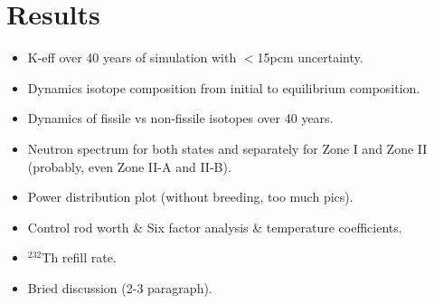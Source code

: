 \section{Results}

\begin{itemize}
  \item K-eff over 40 years of simulation with $<$15pcm uncertainty.
  \item Dynamics isotope composition from initial to equilibrium composition.
  \item Dynamics of fissile vs non-fissile isotopes over 40 years.
  \item Neutron spectrum for both states and separately for Zone I and Zone II (probably, even Zone II-A and II-B).
  \item Power distribution plot (without breeding, too much pics).
  \item Control rod worth \& Six factor analysis \& temperature coefficients.
  \item $^{232}$Th refill rate.
  \item Bried discussion (2-3 paragraph).
\end{itemize}
